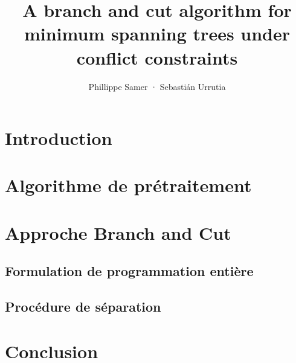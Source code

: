 \documentclass[11pt]{beamer}
\title[presentation]{A branch and cut algorithm for minimum spanning trees
under conflict constraints}
\author[Samer, Urrutia]{
Phillippe Samer · Sebastián Urrutia}
\begin{document}


\section{Introduction} 


\section{Algorithme de prétraitement}


\section{Approche Branch and Cut}


\subsection{Formulation de programmation entière}


%

\subsection{Procédure de séparation}
%



\section{Conclusion}

\end{document}
